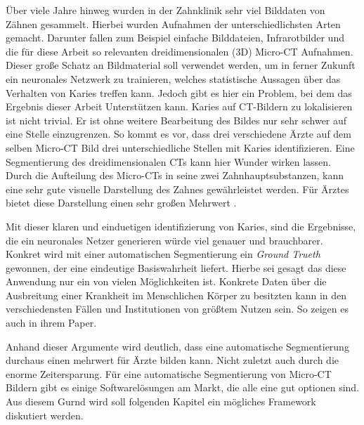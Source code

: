 Über viele Jahre hinweg wurden in der Zahnklinik sehr viel Bilddaten von Zähnen gesammelt.
Hierbei wurden Aufnahmen der unterschiedlichsten Arten gemacht. Darunter fallen zum
Beispiel einfache Bilddateien, Infrarotbilder und die für diese Arbeit so
relevanten dreidimensionalen (3D) Micro-CT Aufnahmen. Dieser große Schatz an Bildmaterial
soll verwendet werden, um in ferner Zukunft ein neuronales Netzwerk zu
trainieren, welches statistische Aussagen über das Verhalten von Karies treffen kann.
Jedoch gibt es hier ein Problem, bei dem das Ergebnis dieser Arbeit Unterstützen
kann. Karies auf CT-Bildern zu lokalisieren ist nicht trivial. Er ist ohne weitere
Bearbeitung des Bildes nur sehr schwer auf eine Stelle einzugrenzen. So kommt es
vor, dass drei verschiedene Ärzte auf dem selben Micro-CT Bild drei unterschiedliche
Stellen mit Karies identifizieren. Eine Segmentierung des dreidimensionalen CTs
kann hier Wunder wirken lassen. Durch die Aufteilung des Micro-CTs in seine zwei
Zahnhauptsubstanzen, kann eine sehr gute visuelle Darstellung des Zahnes
gewährleistet werden. Für Ärztes bietet diese Darstellung einen sehr großen Mehrwert
\citep[vgl.][S. 1]{walter2025projekt}.

Mit dieser klaren und einduetigen identifizierung von Karies, sind die Ergebnisse,
die ein neuronales Netzer generieren würde viel genauer und brauchbarer. Konkret
wird mit einer automatischen Segmentierung ein \textit{Ground Trueth} gewonnen, der
eine eindeutige Basiswahrheit liefert. Hierbe sei gesagt das diese Anwendung nur
ein von vielen Möglichkeiten ist. Konkrete Daten über die Ausbreitung einer Krankheit
im Menschlichen Körper zu besitzten kann in den verschiedensten Fällen und Institutionen
von größtem Nutzen sein. So zeigen es auch \citet{de20083d} in ihrem Paper.

Anhand dieser Argumente wird deutlich, dass eine automatische Segmentierung
durchaus einen mehrwert für Ärzte bilden kann. Nicht zuletzt auch durch die enorme
Zeitersparung. Für eine automatische Segmentierung von Micro-CT Bildern gibt es
einige Softwarelösungen am Markt, die alle eine gut optionen sind. Aus diesem
Gurnd wird soll folgenden Kapitel ein mögliches Framework diskutiert werden.

